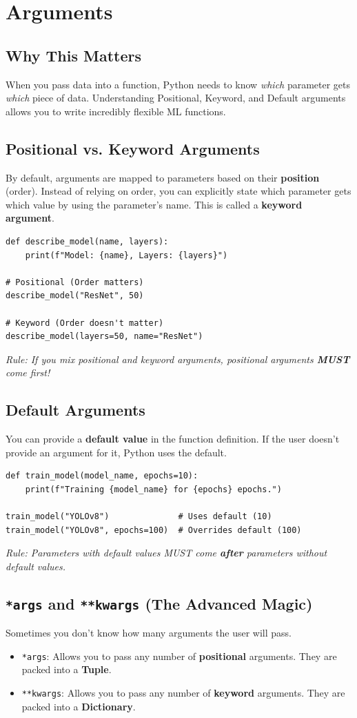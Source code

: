 \chapter{Arguments}

\section{Why This Matters}
When you pass data into a function, Python needs to know \textit{which} parameter gets \textit{which} piece of data. Understanding Positional, Keyword, and Default arguments allows you to write incredibly flexible ML functions.

\section{Positional vs. Keyword Arguments}
By default, arguments are mapped to parameters based on their \textbf{position} (order).
Instead of relying on order, you can explicitly state which parameter gets which value by using the parameter's name. This is called a \textbf{keyword argument}.

\begin{lstlisting}
def describe_model(name, layers):
    print(f"Model: {name}, Layers: {layers}")

# Positional (Order matters)
describe_model("ResNet", 50) 

# Keyword (Order doesn't matter)
describe_model(layers=50, name="ResNet") 
\end{lstlisting}
\textit{Rule: If you mix positional and keyword arguments, positional arguments \textbf{MUST} come first!}

\section{Default Arguments}
You can provide a \textbf{default value} in the function definition. If the user doesn't provide an argument for it, Python uses the default.
\begin{lstlisting}
def train_model(model_name, epochs=10):
    print(f"Training {model_name} for {epochs} epochs.")

train_model("YOLOv8")              # Uses default (10)
train_model("YOLOv8", epochs=100)  # Overrides default (100)
\end{lstlisting}
\textit{Rule: Parameters with default values MUST come \textbf{after} parameters without default values.}

\section{\texttt{*args} and \texttt{**kwargs} (The Advanced Magic)}
Sometimes you don't know how many arguments the user will pass. 
\begin{itemize}
    \item \texttt{*args}: Allows you to pass any number of \textbf{positional} arguments. They are packed into a \textbf{Tuple}.
    \item \texttt{**kwargs}: Allows you to pass any number of \textbf{keyword} arguments. They are packed into a \textbf{Dictionary}.
\end{itemize}

